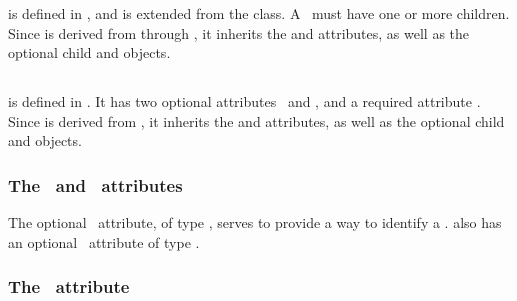  is defined in , and is extended from the  class. A \listOfCompartmentReferences\ must have one or more \CompartmentReference children.  Since  is derived from  through , it inherits the  and  attributes, as well as the optional \mBlockChangedBegin{\revTwentyTwentyMarch}child\mBlockChangedEnd{\revTwentyTwentyMarch}  and  objects. 



\subsection{}
\label{def:CompartmentReference}

 is defined in . It has two optional attributes \idAtt\ and \nameAtt, and a required attribute \compartmentAtt.  Since  is derived from , it inherits the  and  attributes, as well as the optional \mBlockChangedBegin{\revTwentyTwentyMarch}child\mBlockChangedEnd{\revTwentyTwentyMarch}  and  objects. 

\subsubsection{The \idAtt\ and \nameAtt\ attributes}
\label{def:CompartmentReference:idAndName}

The optional \idAtt\ attribute, of type \SIdPT, serves to provide a way to identify a \compartmentReference. \CompartmentReference also has an optional \nameAtt\ attribute of type \stringPT. 

\subsubsection{The \compartmentAtt\ attribute}
\label{def:CompartmentReference:compartment}

